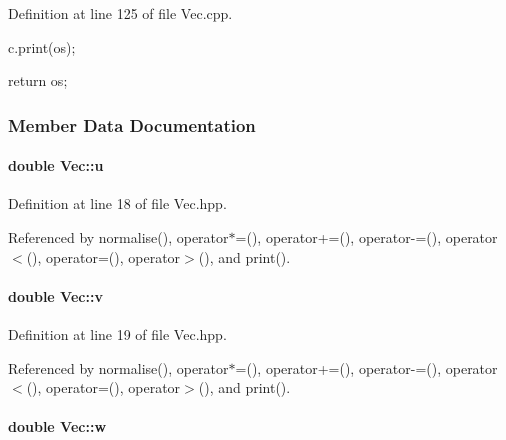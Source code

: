 \-Definition at line 125 of file \-Vec.\-cpp.


\begin{DoxyCode}
{

    c.print(os);

    return os;
}
\end{DoxyCode}


\subsubsection{\-Member \-Data \-Documentation}
\hypertarget{classVec_a463e55879d386da7c31644446a9aba13}{
\paragraph[{u}]{\setlength{\rightskip}{0pt plus 5cm}double {\bf \-Vec\-::u}}}\label{classVec_a463e55879d386da7c31644446a9aba13}


\-Definition at line 18 of file \-Vec.\-hpp.



\-Referenced by normalise(), operator$\ast$=(), operator+=(), operator-\/=(), operator$<$(), operator=(), operator$>$(), and print().

\hypertarget{classVec_a171bde0822311dc8f9ec69e1e90ba2ff}{
\paragraph[{v}]{\setlength{\rightskip}{0pt plus 5cm}double {\bf \-Vec\-::v}}}\label{classVec_a171bde0822311dc8f9ec69e1e90ba2ff}


\-Definition at line 19 of file \-Vec.\-hpp.



\-Referenced by normalise(), operator$\ast$=(), operator+=(), operator-\/=(), operator$<$(), operator=(), operator$>$(), and print().

\hypertarget{classVec_a4e475b48393d5d8f6e1837e2007454b8}{
\paragraph[{w}]{\setlength{\rightskip}{0pt plus 5cm}double {\bf \-Vec\-::w}}}\label{classVec_a4e475b48393d5d8f6e1837e2007454b8}


